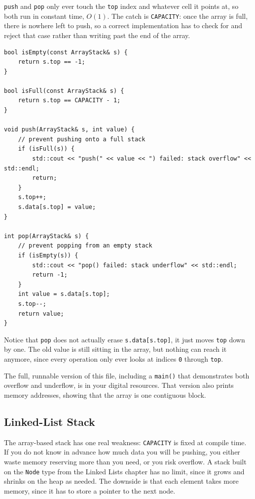 \texttt{push} and \texttt{pop} only ever touch the \texttt{top} index and whatever cell it points at, so both run in constant time, $O(1)$. The catch is \texttt{CAPACITY}: once the array is full, there is nowhere left to push, so a correct implementation has to check for and reject that case rather than writing past the end of the array.

\begin{verbatim}
bool isEmpty(const ArrayStack& s) {
    return s.top == -1;
}

bool isFull(const ArrayStack& s) {
    return s.top == CAPACITY - 1;
}

void push(ArrayStack& s, int value) {
    // prevent pushing onto a full stack
    if (isFull(s)) {
        std::cout << "push(" << value << ") failed: stack overflow" << std::endl;
        return;
    }
    s.top++;
    s.data[s.top] = value;
}

int pop(ArrayStack& s) {
    // prevent popping from an empty stack
    if (isEmpty(s)) {
        std::cout << "pop() failed: stack underflow" << std::endl;
        return -1;
    }
    int value = s.data[s.top];
    s.top--;
    return value;
}
\end{verbatim}

Notice that \texttt{pop} does not actually erase \texttt{s.data[s.top]},
it just moves \texttt{top} down by one. The old value is still sitting
in the array, but nothing can reach it anymore, since every operation 
only ever looks at indices \texttt{0} through \texttt{top}. 

The full, 
runnable version of this file, including a \texttt{main()} that 
demonstrates both overflow and underflow, is in your digital resources. That version also prints memory addresses, showing that the array is one contiguous block.

\subsection{Linked-List Stack}

The array-based stack has one real weakness: \texttt{CAPACITY} is fixed at compile time. If you do not know in advance how much data you will be pushing, you either waste memory reserving more than you need, or you risk overflow. A stack built on the \texttt{Node} type from the Linked Lists chapter has no limit, since it grows and shrinks on the heap as needed. The downside is that each element takes more memory, since it has to store a pointer to the next node.

